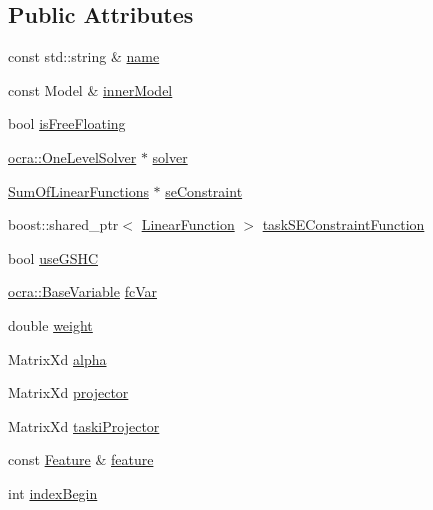 \subsection*{Public Attributes}
\begin{DoxyCompactItemize}
\item 
const std\+::string \& \hyperlink{structgocra_1_1GHCJTTask_1_1Pimpl_a62bf1c09164be6cf8a48360bd6e53d64}{name}
\item 
const Model \& \hyperlink{structgocra_1_1GHCJTTask_1_1Pimpl_a7f03506d78950aa1a986d2ba44142f28}{inner\+Model}
\item 
bool \hyperlink{structgocra_1_1GHCJTTask_1_1Pimpl_a3fefbc36e9c5e9b8c4fc8f85fb19da53}{is\+Free\+Floating}
\item 
\hyperlink{classocra_1_1OneLevelSolver}{ocra\+::\+One\+Level\+Solver} $\ast$ \hyperlink{structgocra_1_1GHCJTTask_1_1Pimpl_ac9f3b5650e8663982f631c354a25e3b9}{solver}
\item 
\hyperlink{classocra_1_1SumOfLinearFunctions}{Sum\+Of\+Linear\+Functions} $\ast$ \hyperlink{structgocra_1_1GHCJTTask_1_1Pimpl_ab0953e75c824e2aa63477976b94a1806}{se\+Constraint}
\item 
boost\+::shared\+\_\+ptr$<$ \hyperlink{classocra_1_1LinearFunction}{Linear\+Function} $>$ \hyperlink{structgocra_1_1GHCJTTask_1_1Pimpl_ab1b71cfa2f203377834f529d2c0e98c3}{task\+S\+E\+Constraint\+Function}
\item 
bool \hyperlink{structgocra_1_1GHCJTTask_1_1Pimpl_a0beb46ac94216a28202956bf87fc1d2d}{use\+G\+S\+HC}
\item 
\hyperlink{classocra_1_1BaseVariable}{ocra\+::\+Base\+Variable} \hyperlink{structgocra_1_1GHCJTTask_1_1Pimpl_a98ad4a4d2e7bbba67daa244e45f75345}{fc\+Var}
\item 
double \hyperlink{structgocra_1_1GHCJTTask_1_1Pimpl_a5bf2a2e00bd9406bb6a993b616a47d07}{weight}
\item 
Matrix\+Xd \hyperlink{structgocra_1_1GHCJTTask_1_1Pimpl_a71d5221274d0ee84040992042d609cec}{alpha}
\item 
Matrix\+Xd \hyperlink{structgocra_1_1GHCJTTask_1_1Pimpl_ab17e7af214e9801bfb03e4d9ed6dad29}{projector}
\item 
Matrix\+Xd \hyperlink{structgocra_1_1GHCJTTask_1_1Pimpl_a0ae67b26b52f69987d41bc3232636ccb}{taski\+Projector}
\item 
const \hyperlink{classocra_1_1Feature}{Feature} \& \hyperlink{structgocra_1_1GHCJTTask_1_1Pimpl_aa7c75169490e6b35ff7bdb1baf696c5d}{feature}
\item 
int \hyperlink{structgocra_1_1GHCJTTask_1_1Pimpl_a20542f3c613a7f9c0771c2b5ac0b38eb}{index\+Begin}

\end{DoxyCompactItemize}
